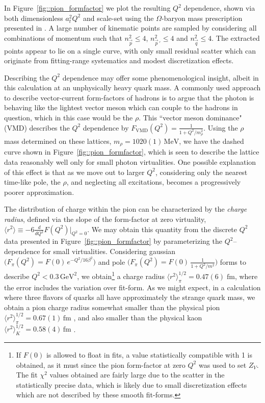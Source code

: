 In Figure~\ref{fig::pion_formfactor} we plot the resulting $Q^2$ dependence, shown via both dimensionless $a_t^2 Q^2$ and scale-set using the $\Omega$-baryon mass prescription presented in . A large number of kinematic points are sampled by considering all combinations of momentum such that $n^2_{\vec{p}} \le 4$, $ n^2_{\vec{p}\,'} \le 4$ and $ n^2_{\vec{q}} \le 4$. The extracted points appear to lie on a single curve, with only small residual scatter which can originate from fitting-range systematics and modest discretization effects.

Describing the $Q^2$ dependence may offer some phenomenological insight, albeit in this calculation at an unphysically heavy quark mass. A commonly used approach to describe vector-current form-factors of hadrons is to argue that the photon is behaving like the lightest vector meson which can couple to the hadrons in question, which in this case would be the $\rho$. This ``vector meson dominance"(VMD) describes the $Q^2$ dependence by ${F_{\mathrm{VMD}}(Q^2) = \frac{1}{1 + Q^2/m_\rho^2 }}$. Using the $\rho$ mass determined on these lattices, $m_\rho = 1020(1)\, \mathrm{MeV}$, we have the dashed curve shown in Figure~\ref{fig::pion_formfactor}, which is seen to describe the lattice data reasonably well only for small photon virtualities. One possible explanation of this effect is that as we move out to larger $Q^2$, considering only the nearest time-like pole, the $\rho$, and neglecting all excitations, becomes a progressively poorer approximation.

 
The distribution of charge within the pion can be characterized by the \emph{charge radius}, defined via the slope of the form-factor at zero virtuality, ${\langle r^2 \rangle \equiv -6 \frac{d}{dQ^2}F(Q^2) \big|_{Q^2=0}}$. We may obtain this quantity from the discrete $Q^2$ data presented in Figure~\ref{fig::pion_formfactor} by parameterizing the $Q^2$--dependence for small virtualities. Considering gaussian ${ \big(  F_\pi(Q^2) = F(0)\, e^{-Q^2/16\beta^2}  \big) }$ and pole ${ \big(  F_\pi(Q^2) = F(0)\, \tfrac{1}{1 + Q^2/m^2} \big) }$ forms to describe ${Q^2 < 0.3\,\mathrm{GeV}^2}$, we obtain\footnote{If $F(0)$ is allowed to float in fits, a value statistically compatible with 1 is obtained, as it must since the pion form-factor at zero $Q^2$ was used to set $Z_V$. The fit $\chi^2$ values obtained are fairly large due to the scatter in the statistically precise data, which is likely due to small discretization effects which are not described by these smooth fit-forms.} 
a charge radius ${  \langle r^2 \rangle_{\pi}^{1/2} = 0.47(6) \; \mathrm{fm}  }$, where the error includes the variation over fit-form. As we might expect, in a calculation where three flavors of quarks all have approximately the strange quark mass, we obtain a pion charge radius somewhat smaller than the physical pion ${\langle r^2 \rangle_\pi^{1/2} = 0.67(1)\,\mathrm{fm}}$ \cite{Amendolia:1986wj, PDG-2012}, and also smaller than the physical kaon ${  \langle r^2 \rangle_K^{1/2} = 0.58(4) \, \mathrm{fm}  }$ \cite{Amendolia:1986ui}.








